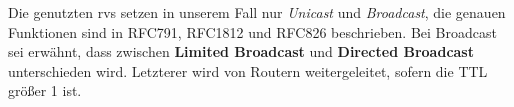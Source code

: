 Die genutzten \glspl{rv} setzen in unserem Fall nur \textit{Unicast} und \textit{Broadcast}, die genauen Funktionen sind in RFC791, RFC1812 und RFC826 beschrieben. Bei Broadcast sei erwähnt, dass zwischen \textbf{Limited Broadcast} und \textbf{Directed Broadcast} unterschieden wird. Letzterer wird von Routern weitergeleitet, sofern die TTL größer 1 ist.



%


